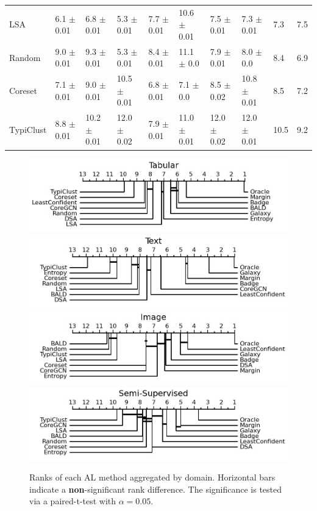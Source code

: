 \documentclass[]{article}
\begin{document}
\begin{table}[]
{\begin{tabular}{l|lllllll|ll}
LSA      & 6.1 $\pm$ {\small 0.01} & 6.8 $\pm$ {\small 0.01} & 5.3 $\pm$ {\small 0.01} & 7.7 $\pm$ {\small 0.01} & 10.6 $\pm$ {\small 0.01} & 7.5 $\pm$ {\small 0.01} & 7.3 $\pm$ {\small 0.01} & 7.3 & 7.5 \\
Random   & 9.0 $\pm$ {\small 0.01} & 9.3 $\pm$ {\small 0.01} & 5.3 $\pm$ {\small 0.01} & 8.4 $\pm$ {\small 0.01} & 11.1 $\pm$ {\small 0.0}  & 7.9 $\pm$ {\small 0.01} & 8.0 $\pm$ {\small 0.0} & 8.4 & 6.9 \\
Coreset  & 7.1 $\pm$ {\small 0.01} & 9.0 $\pm$ {\small 0.01} & 10.5 $\pm$ {\small 0.01} & 6.8 $\pm$ {\small 0.01} & 7.1 $\pm$ {\small 0.0}  & 8.5 $\pm$ {\small 0.02} & 10.8 $\pm$ {\small 0.01} & 8.5 & 7.2 \\
TypiClust & 8.8 $\pm$ {\small 0.01} & 10.2 $\pm$ {\small 0.01} & 12.0 $\pm$ {\small 0.02} & 7.9 $\pm$ {\small 0.01} & 11.0 $\pm$ {\small 0.01} & 12.0 $\pm$ {\small 0.02} & 12.0 $\pm$ {\small 0.01} & 10.5 & 9.2 \\
\end{tabular}
       	}
\end{table}
%
\begin{figure}
    \centering
    \caption{Ranks of each AL method aggregated by domain. Horizontal bars indicate a \textbf{non}-significant rank difference. The significance is tested via a paired-t-test with $\alpha=0.05$.}
    \label{fig:ranks_by_domain}
    \includegraphics[width=0.49\linewidth]{img/macro_vector.jpg}
    \includegraphics[width=0.49\linewidth]{img/macro_text.jpg}
    \includegraphics[width=0.49\linewidth]{img/macro_img.jpg}
    \includegraphics[width=0.49\linewidth]{img/macro_enc.jpg}
    \vspace{-5mm}
\end{figure}
%
\end{document}
